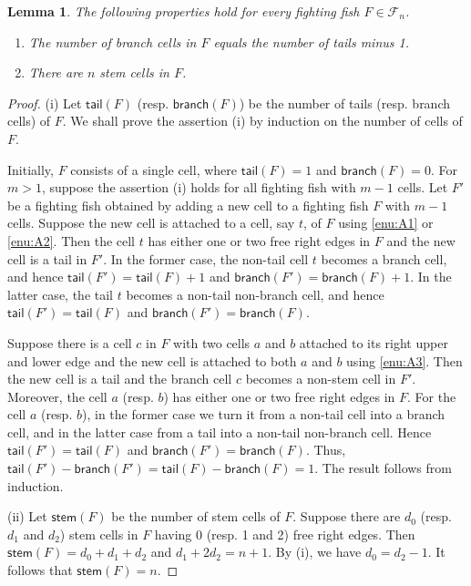 \documentclass[a4paper,11pt,reqno]{amsart}
\newtheorem{lem}{Lemma}[section]
\theoremstyle{definition}
\numberwithin{equation}{section}
\newcommand{\stem}{{\mathsf{stem}}}
\newcommand{\tail}{{\mathsf{tail}}}
\newcommand{\branch}{{\mathsf{branch}}}
\newcommand{\F}{{\mathcal{F}}}
\begin{document}
\begin{lem} \label{lem:number-stem-cells}
The following properties hold for every fighting fish $F\in\F_n$.
\begin{enumerate}
\item The number of branch cells in $F$ equals the number of tails minus 1.
\item There are $n$ stem cells in $F$.
\end{enumerate}
\end{lem}

\begin{proof} (i) Let $\tail(F)$ (resp. $\branch(F)$) be the number of tails (resp. branch cells) of $F$. We shall prove the assertion (i) by induction on the number of cells of $F$.

Initially, $F$ consists of a single cell, where $\tail(F)=1$ and $\branch(F)=0$. For $m>1$, suppose the assertion (i) holds for all fighting fish with $m-1$ cells. Let $F'$ be a fighting fish obtained by adding a new cell to a fighting fish $F$ with $m-1$ cells. Suppose the new cell is attached to a cell, say $t$, of $F$ using \ref{enu:A1} or \ref{enu:A2}. Then the cell $t$ has either one or two free right edges in $F$ and the new cell is a tail in $F'$. In the former case, the non-tail cell $t$ becomes a branch cell, and hence $\tail(F')=\tail(F)+1$ and $\branch(F')=\branch(F)+1$. In the latter case, the tail $t$ becomes a non-tail non-branch cell, and hence $\tail(F')=\tail(F)$ and $\branch(F')=\branch(F)$.

Suppose there is a cell $c$ in $F$ with two cells $a$ and $b$ attached to its right upper and lower edge and the new cell is attached to both $a$ and $b$ using \ref{enu:A3}. Then the new cell is a tail and the branch cell $c$ becomes a non-stem cell in $F'$. Moreover, the cell $a$ (resp. $b$) has either one or two free right edges in $F$. For the cell $a$ (resp. $b$), in the former case we turn it from a non-tail cell into a branch cell, and in the latter case from a tail into a non-tail non-branch cell. Hence $\tail(F')=\tail(F)$ and $\branch(F')=\branch(F)$. Thus, $\tail(F')-\branch(F')=\tail(F)-\branch(F)=1$. The result follows from induction. 


(ii) Let $\stem(F)$ be the number of stem cells of $F$. Suppose there are $d_0$ (resp. $d_1$ and $d_2$) stem cells in $F$ having 0 (resp. 1 and 2) free right edges. Then $\stem(F)=d_0+d_1+d_2$ and $d_1+2d_2=n+1$. By (i), we have $d_0=d_2-1$. It follows that $\stem(F)=n$. 
\end{proof}
\end{document}
